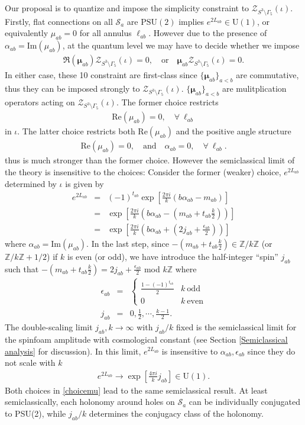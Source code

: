 \documentclass[aps,prd,notitlepage,nofootinbib,superscriptaddress,groupedaddress,twocolumn]{revtex4-1}
\newcommand{\PSu}{\mathrm{PSU}(2)}
\def\be{\begin{eqnarray}}
\def\ee{\end{eqnarray}}
\newcommand{\cs}{\mathcal S}
\newcommand{\cz}{\mathcal Z}
\renewcommand{\a}{\alpha}
\newcommand{\G}{\Gamma}
\newcommand{\lt}{\left}
\newcommand{\rt}{\right}
\begin{document}
Our proposal is to quantize and impose the simplicity constraint to $\cz_{S^3\setminus\G_5}(\iota)$. Firstly, flat connections on all $\cs_{a}$ are $\PSu$ implies $e^{2L_{ab}}\in \mathrm{U(1)}$, or equivalently $\mu_{ab}=0$ for all annulus $\ell_{ab}$. However due to the presence of $\a_{ab}=\mathrm{Im}(\mu_{ab})$, at the quantum level we may have to decide whether we impose
\be
\Re(\bm{\mu}_{ab})\cz_{S^3\setminus\G_5}(\iota)=0,\quad\text{or}\quad\bm{\mu}_{ab}\cz_{S^3\setminus\G_5}(\iota)=0.  \label{choicemu}
\ee
In either case, these 10 constraint are first-class since $\{\bm{\mu}_{ab}\}_{a<b}$ are commutative, thus they can be imposed strongly to $\cz_{S^3\setminus\G_5}(\iota)$. $\{\bm{\mu}_{ab}\}_{a<b}$ are mulitplication operators acting on $\cz_{S^3\setminus\G_5}(\iota)$. The former choice restricts 
\be
\mathrm{Re}(\mu_{ab})=0,\quad \forall\ \ell_{ab}\label{Remu=0}
\ee
in $\iota$. The latter choice restricts both $\mathrm{Re}(\mu_{ab})$ and the positive angle structure
\be
\mathrm{Re}(\mu_{ab})=0,\quad \text{and}\quad \a_{ab}=0,\quad \forall\ \ell_{ab}.\label{strongerch}
\ee
thus is much stronger than the former choice. However the semiclassical limit of the theory is insensitive to the choices: Consider the former (weaker) choice, $e^{2L_{ab}}$ determined by $\iota$ is given by
\be
e^{2L_{ab}}&=&(-1)^{t_{ab}}\exp \left[\frac{2 \pi i}{k}\left( b \a_{ab}-m_{ab}\right)\right]\nonumber\\
&=&\exp \left[\frac{2 \pi i}{k}\left( b \a_{ab}-\lt(m_{ab}+t_{ab}\frac{k}{2}\rt)\right)\right]\nonumber\\
&=&\exp \left[\frac{2 \pi i}{k}\left( b \a_{ab}+\lt(2j_{ab}+\frac{\epsilon_{ab}}{2}\rt)\right)\right]\label{e2Labjab}
\ee
where $\a_{ab}=\mathrm{Im}(\mu_{ab})$. In the last step, since $-(m_{ab}+t_{ab}\frac{k}{2})\in \mathbb{Z}/k\mathbb{Z}$ (or $\mathbb{Z}/k\mathbb{Z}+1/2$) if $k$ is even (or odd), we have introduce the half-integer ``spin'' $j_{ab}$ such that $-\lt(m_{ab}+t_{ab}\frac{k}{2}\rt)=2j_{ab}+\frac{\epsilon_{ab}}{2}$ mod $k\mathbb{Z}$ where
\be
 \epsilon_{ab}&=&\begin{cases}
	\frac{1-(-1)^{t_{ab}}}{2} & k\ \text{odd}\\
	0 & k\ \text{even}
\end{cases}\\
j_{ab}&=& 0,\frac{1}{2},\cdots, \frac{k-1}{2}\label{jrange}.
\ee
The double-scaling limit $j_{ab},k\to \infty$ with $j_{ab}/k$ fixed is the semiclassical limit for the spinfoam amplitude with cosmological constant (see Section \ref{Semiclassical analysis} for discussion). In this limit, $e^{2L_{ab}}$ is insensitive to $\a_{ab},\epsilon_{ab}$ since they do not scale with $k$
\be
e^{2L_{ab}}\to\exp \left[\frac{4 \pi i}{k}j_{ab}\right]\in \mathrm{U(1)}.\label{conjclass}
\ee
Both choices in \eqref{choicemu} lead to the same semiclassical result. At least semiclassically, each holonomy around holes on $\cs_a$ can be individually conjugated to PSU(2), while $j_{ab}/k$ determines the conjugacy class of the holonomy.
\end{document}
